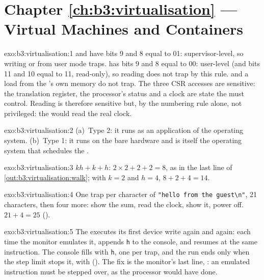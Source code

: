 \section*{Chapter \ref{ch:b3:virtualisation} --- Virtual Machines and Containers}

\begin{solution}{exo:b3:virtualisation:1}
 and  have bits 9 and 8 equal to 01: supervisor-level, so writing  or  from user mode traps.  has bits 9 and 8 equal to 00: user-level (and bits 11 and 10 equal to 11, read-only), so reading  does not trap by this rule.  and a load from the 's own memory do not trap. The three CSR accesses are sensitive: the translation register, the processor's status and a clock are state the  must control. Reading  is therefore sensitive but, by the numbering rule alone, not privileged: the  would read the real clock.
\end{solution}

\begin{solution}{exo:b3:virtualisation:2}
(a)~Type 2: it runs as an application of the  operating system. (b)~Type 1: it runs on the bare hardware and is itself the operating system that schedules the .
\end{solution}

\begin{solution}{exo:b3:virtualisation:3}
$kh + k + h$: $2 \times 2 + 2 + 2 = 8$, as in the last line of \cref{out:b3:virtualisation:walk}; with $k = 2$ and $h = 4$, $8 + 2 + 4 = 14$.
\end{solution}

\begin{solution}{exo:b3:virtualisation:4}
One trap per character of \texttt{"hello from the guest\textbackslash n"}, 21 characters, then four more: show the sum, read the clock, show it, power off. $21 + 4 = 25$ ().
\end{solution}

\begin{solution}{exo:b3:virtualisation:5}
The  executes its first device write again and again: each time the monitor emulates it, appends \texttt{h} to the console, and resumes at the same instruction. The console fills with \texttt{h}, one per trap, and the run ends only when the step limit stops it, with  (). The fix is the monitor's last line, : an emulated instruction must be stepped over, as the processor would have done.
\end{solution}

